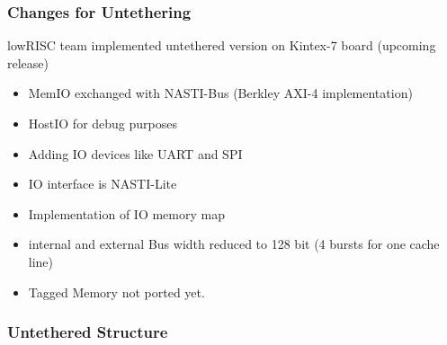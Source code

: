 \documentclass{beamer}
\begin{document}
\begin{frame}
	\frametitle{Changes for Untethering}
	lowRISC team implemented untethered version on Kintex-7 board (upcoming release)
	\begin{itemize}
	\item MemIO exchanged with NASTI-Bus (Berkley AXI-4 implementation)
	\item HostIO for debug purposes
	\item Adding IO devices like UART and SPI
	\item IO interface is NASTI-Lite
	\item Implementation of IO memory map
	\item internal and external Bus width reduced to 128 bit (4 bursts for one cache line)
	\item Tagged Memory not ported yet.
	\end{itemize}
\end{frame}

\begin{frame}
	\frametitle{Untethered Structure}
	\begin{figure}[!h]
	\begin{center}
	\end{center}
	\end{figure}
\end{frame}
\end{document}
